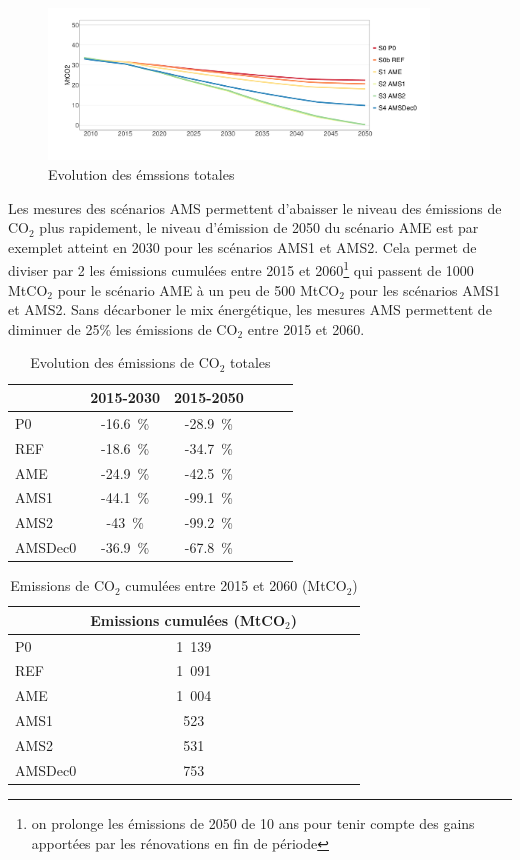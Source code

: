 \documentclass[10.5pt,a4paper]{article}
\begin{document}
{\begin{figure}[h!]
\centering
\caption{Evolution des émssions totales} \label{Evol_Em_tot-1}  
\includegraphics[width = 0.9\textwidth]{Evol_Em_tot-1}  
\end{figure}

Les mesures des scénarios AMS permettent d'abaisser le niveau des émissions de CO$_2$ plus rapidement, le niveau d'émission de 2050 du scénario AME est par exemplet atteint en 2030 pour les scénarios AMS1 et AMS2. Cela permet de diviser par 2 les émissions cumulées entre 2015 et 2060\footnote{on prolonge les émissions de 2050 de 10 ans pour tenir compte des gains apportées par les rénovations en fin de période} qui passent de 1000 MtCO$_2$ pour le scénario AME à un peu de 500 MtCO$_2$ pour les scénarios AMS1 et AMS2. Sans décarboner le mix énergétique, les mesures AMS permettent de diminuer de 25\% les émissions de CO$_2$ entre 2015 et 2060.  

\begin{table}[h!] \caption{Evolution des émissions de CO$_2$ totales}
\centering
\begin{tabular}[c]{|l|c|c|c|c|c|}
\hline
				& 	2015-2030  &2015-2050 \\
				\hline
P0  		&		-16.6~\%  & -28.9~\% \\
REF  		&		-18.6~\% 	& -34.7~\% \\
AME  		&		-24.9~\%  & -42.5~\% \\
AMS1  	&		-44.1~\%  & -99.1~\% \\
AMS2  	&		-43~\%  	& -99.2~\% \\
AMSDec0 & 	-36.9~\%  & -67.8~\% \\
\hline
\end{tabular}
\end{table}

\begin{table}[h!] \caption{Emissions de CO$_2$ cumulées entre 2015 et 2060 (MtCO$_2$)}
\centering
\begin{tabular}[c]{|l|c|c|c|c|c|}
\hline
				& Emissions cumulées (MtCO$_2$) \\
\hline				
P0 			& 1~139 \\
REF 		& 1~091 \\
AME 		& 1~004 \\
AMS1 		& 523 \\
AMS2 		& 531 \\
AMSDec0 & 753 \\
\hline
\end{tabular}
\end{table}


}
\end{document}
